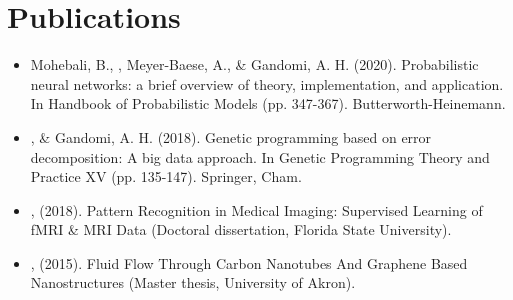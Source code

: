 \documentclass[]{template}
\begin{document}
\section{Publications}
\sectionsep
{}
\sectionsep
\begin{itemize}

\item Mohebali, B., , Meyer-Baese, A., \& Gandomi, A. H. (2020). Probabilistic neural networks: a brief overview of theory, implementation, and application. In Handbook of Probabilistic Models (pp. 347-367). Butterworth-Heinemann.

\item {}, \& Gandomi, A. H. (2018). Genetic programming based on error decomposition: A big data approach. In Genetic Programming Theory and Practice XV (pp. 135-147). Springer, Cham.


\item {}, (2018). Pattern Recognition in Medical Imaging: Supervised Learning of fMRI \& MRI Data (Doctoral dissertation, Florida State University).

\item {}, (2015). Fluid Flow Through Carbon Nanotubes And Graphene Based Nanostructures (Master thesis, University of Akron).


\end{itemize}
\end{document}
